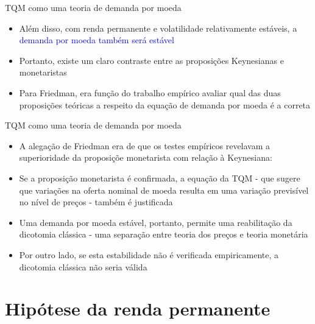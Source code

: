 \documentclass[10pt]{beamer}
\begin{document}
\begin{frame}{TQM como uma teoria de demanda por moeda}
    \begin{itemize}
        \item Além disso, com renda permanente e volatilidade relativamente estáveis, a \textcolor{blue}{demanda por moeda também será estável}
        \bigskip
        \item Portanto, existe um claro contraste entre as proposições Keynesianas e monetaristas
        \bigskip
        \item Para Friedman, era função do trabalho empírico avaliar qual das duas proposições teóricas a respeito da equação de demanda por moeda é a correta
    \end{itemize}
\end{frame}

\begin{frame}{TQM como uma teoria de demanda por moeda}
    \begin{itemize}
        \item A alegação de Friedman era de que os testes empíricos revelavam a superioridade da proposiçõe monetarista com relação à Keynesiana:
        \bigskip
        \item Se a proposição monetarista é confirmada, a equação da TQM - que sugere que variações na oferta nominal de moeda resulta em uma variação previsível no nível de preços - também é justificada
        \bigskip
        \item Uma demanda por moeda estável, portanto, permite uma reabilitação da dicotomia clássica - uma separação entre teoria dos preços e teoria monetária
        \bigskip
        \item Por outro lado, se esta estabilidade não é verificada empiricamente, a dicotomia clássica não seria válida
    \end{itemize}
\end{frame}

\section{Hipótese da renda permanente}
\end{document}
